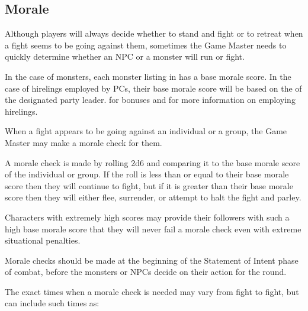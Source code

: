 \begin{multicols*}{2}
\section{Morale}\label{sec:Morale}
Although players will always decide whether to stand and fight or to retreat when a fight seems to be going against them, sometimes the Game Master needs to quickly determine whether an NPC or a monster will run or fight.

In the case of monsters, each monster listing in  has a base morale score. In the case of hirelings employed by PCs, their base morale score will be based on the  of the designated party leader.  for  bonuses and  for more information on employing hirelings.

When a fight appears to be going against an individual or a group, the Game Master may make a morale check for them.

A morale check is made by rolling 2d6 and comparing it to the base morale score of the individual or group. If the roll is less than or equal to their base morale score then they will continue to fight, but if it is greater than their base morale score then they will either flee, surrender, or attempt to halt the fight and parley.

Characters with extremely high  scores may provide their followers with such a high base morale score that they will never fail a morale check even with extreme situational penalties.

Morale checks should be made at the beginning of the Statement of Intent phase of combat, before the monsters or NPCs decide on their action for the round.

The exact times when a morale check is needed may vary from fight to fight, but can include such times as:


\end{multicols*}
